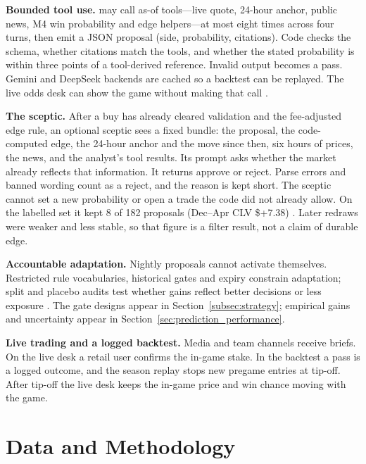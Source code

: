 \documentclass[11pt,a4paper]{article}
\newcommand{\code}[1]{\path{#1}}
\begin{document}
\textbf{Bounded tool use.} \code{ToolAgent} may call as-of tools---live quote,
24-hour anchor, public news, M4 win probability and edge helpers---at most
eight times across four turns, then emit a JSON proposal (side, probability,
citations). Code checks the schema, whether citations match the tools, and
whether the stated probability is within three points of a tool-derived
reference. Invalid output becomes a pass. Gemini and DeepSeek backends are
cached so a backtest can be replayed. The live odds desk can show the game
without making that call \cite{llm-evaluation}.

\textbf{The sceptic.} After a buy has already cleared validation and the
fee-adjusted edge rule, an optional sceptic sees a fixed bundle: the proposal,
the code-computed edge, the 24-hour anchor and the move since then, six hours
of prices, the news, and the analyst's tool results. Its prompt asks whether
the market already reflects that information. It returns approve or reject.
Parse errors and banned wording count as a reject, and the reason is kept
short. The sceptic cannot set a new probability or open a trade the code did
not already allow. On the labelled set it kept 8 of 182 proposals
(Dec--Apr CLV \$+7.38) \cite{llm-evaluation}. Later redraws were weaker and
less stable, so that figure is a filter result, not a claim of durable edge.

\textbf{Accountable adaptation.} Nightly proposals cannot activate themselves.
Restricted rule vocabularies, historical gates and expiry constrain adaptation;
split and placebo audits test whether gains reflect better decisions or less
exposure \cite{agentic-rationale,gate-audit}. The gate designs appear in
Section~\ref{subsec:strategy}; empirical gains and uncertainty appear in
Section~\ref{sec:prediction_performance}.

\textbf{Live trading and a logged backtest.} Media and team channels receive
briefs. On the live desk a retail user confirms the in-game stake. In the
backtest a pass is a logged outcome, and the season replay stops new pregame
entries at tip-off. After tip-off the live desk keeps the in-game price and
win chance moving with the game.

\section{Data and Methodology}
\label{sec:methodology}
\end{document}
